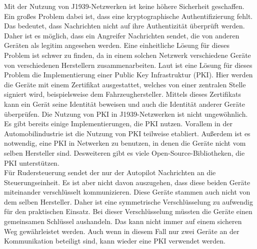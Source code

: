 Mit der Nutzung von J1939-Netzwerken ist keine höhere Sicherheit geschaffen. Ein großes Problem dabei ist, dass
eine kryptographische Authentifizierung fehlt. Das bedeutet, dass Nachrichten nicht auf ihre Authentizität überprüft werden.
Daher ist es möglich, dass ein Angreifer Nachrichten sendet, die von anderen Geräten als legitim angesehen werden.
Eine einheitliche Lösung für dieses Problem ist schwer zu finden, da in einem solchen Netzwerk verschiedene Geräte
von verschiedenen Herstellern zusammenarbeiten. Laut \cite{Murvay2018} ist eine Lösung für dieses Problem die Implementierung einer 
Public Key Infrastruktur (PKI).
Hier werden die Geräte mit einem Zertifikat ausgestattet, welches von einer zentralen Stelle signiert wird, beispielsweise
dem Fahrzeughersteller. Mittels dieses Zertifikats kann ein Gerät seine Identität beweisen und auch die Identität anderer Geräte
überprüfen. 
Die Nutzung von PKI in J1939-Netzwerken ist nicht ungewöhnlich. Es gibt bereits einige Implementierungen, die PKI nutzen.
Vorallem in der Automobilindustrie ist die Nutzung von PKI teilweise etabliert. Außerdem ist es notwendig, eine PKI in 
Netwerken zu benutzen, in denen die Geräte nicht vom selben Hersteller sind.
Desweiteren gibt es viele Open-Source-Bibliotheken,
die PKI unterstützen. 
 \\
Für Rudersteuerung sendet der nur der Autopilot Nachrichten an die Steuerungseinheit. Es ist aber nicht davon auszugehen,
dass diese beiden Geräte miteinander verschlüsselt kommunizieren. Diese Geräte stammen auch nicht von dem selben Hersteller.
Daher ist eine symmetrische Verschlüsselung zu aufwendig für den praktischen Einsatz. Bei dieser Verschlüsselung müssten
die Geräte einen gemeinsamen Schlüssel aushandeln. Das kann nicht immer auf einem sicheren Weg gewährleistet werden.
Auch wenn in diesem Fall nur zwei Geräte an der Kommunikation beteiligt sind, kann wieder eine PKI verwendet werden.

